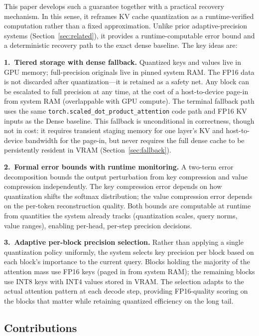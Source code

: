 \documentclass[10pt,twocolumn,a4paper]{article}
\theoremstyle{definition}
\theoremstyle{remark}
\newcommand{\torchsdpa}{\texttt{torch.scaled\_\hspace{0pt}dot\_\hspace{0pt}product\_\hspace{0pt}attention}}
\begin{document}
This paper develops such a guarantee together with a practical recovery mechanism.  In this sense, it reframes KV cache quantization as a runtime-verified computation rather than a fixed approximation.  Unlike prior adaptive-precision systems (Section~\ref{sec:related}), it provides a runtime-computable error bound and a deterministic recovery path to the exact dense baseline.  The key ideas are:

\textbf{1.\ Tiered storage with dense fallback.}  Quantized keys and values live in GPU memory; full-precision originals live in pinned system RAM\@.  The FP16 data is not discarded after quantization---it is retained as a safety net.  Any block can be escalated to full precision at any time, at the cost of a host-to-device page-in from system RAM (overlappable with GPU compute).  The terminal fallback path uses the same \torchsdpa{} code path and FP16 KV inputs as the Dense baseline.  This fallback is unconditional in correctness, though not in cost: it requires transient staging memory for one layer's KV and host-to-device bandwidth for the page-in, but never requires the full dense cache to be persistently resident in VRAM (Section~\ref{sec:fallback}).

\textbf{2.\ Formal error bounds with runtime monitoring.}  A two-term error decomposition bounds the output perturbation from key compression and value compression independently.  The key compression error depends on how quantization shifts the softmax distribution; the value compression error depends on the per-token reconstruction quality.  Both bounds are computable at runtime from quantities the system already tracks (quantization scales, query norms, value ranges), enabling per-head, per-step precision decisions.

\textbf{3.\ Adaptive per-block precision selection.}  Rather than applying a single quantization policy uniformly, the system selects key precision per block based on each block's importance to the current query.  Blocks holding the majority of the attention mass use FP16 keys (paged in from system RAM); the remaining blocks use INT8 keys with INT4 values stored in VRAM.  The selection adapts to the actual attention pattern at each decode step, providing FP16-quality scoring on the blocks that matter while retaining quantized efficiency on the long tail.

\subsection{Contributions}
\end{document}
